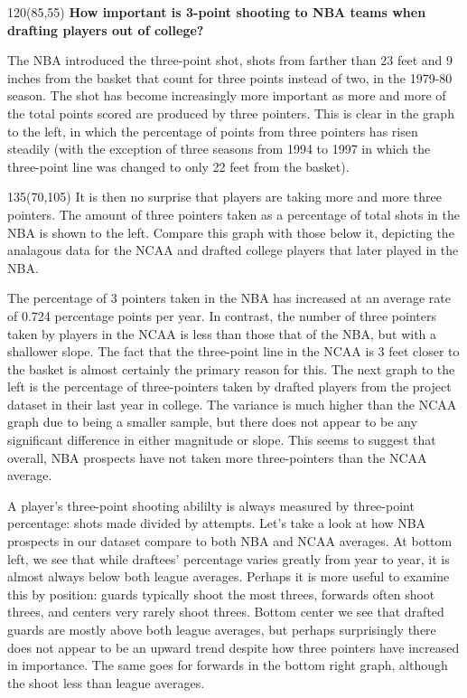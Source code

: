 \documentclass{article}
\begin{document}
   
\begin{textblock}{120}(85,55)
{\bf How important is 3-point shooting to NBA teams when drafting players out of college?}

\vspace{0.1in}
     The NBA introduced the three-point shot, shots from farther than 23 feet and 9 inches from the basket that count for three points instead of two, in the 1979-80 season. The shot has become increasingly more important as more and more of the total points scored are produced by three pointers. This is clear in the graph to the left, in which the percentage of points from three pointers has risen steadily (with the exception of three seasons from 1994 to 1997 in which the three-point line was changed to only 22 feet from the basket).
         \end{textblock}  
         
         

\begin{textblock}{135}(70,105)  
     It is then no surprise that players are taking more and more three pointers. The amount of three pointers taken as a percentage of total shots in the NBA is shown to the left. Compare this graph with those below it, depicting the analagous data for the NCAA and drafted college players that later played in the NBA. 
     
     The percentage of 3 pointers taken in the NBA has increased at an average rate of 0.724 percentage points per year. In contrast, the number of three pointers taken by players in the NCAA is less than those that of the NBA, but with a shallower slope. The fact that the three-point line in the NCAA is 3 feet closer to the basket is almost certainly the primary reason for this. The next graph to the left is the percentage of three-pointers taken by drafted players from the project dataset in their last year in college. The variance is much higher than the NCAA graph due to being a smaller sample, but there does not appear to be any significant difference in either magnitude or slope. This seems to suggest that overall, NBA prospects have not taken more three-pointers than the NCAA average.
     
     \vspace{0.1in}
     A player's three-point shooting abililty is always measured by three-point percentage: shots made divided by attempts. Let's take a look at how NBA prospects in our dataset compare to both NBA and NCAA averages. At bottom left, we see that while draftees' percentage varies greatly from year to year, it is almost always below both league averages. Perhaps it is more useful to examine this by position: guards typically shoot the most threes, forwards often shoot threes, and centers very rarely shoot threes.
     Bottom center we see that drafted guards are mostly above both league averages,  but perhaps surprisingly there does not appear to be an upward trend despite how three pointers have increased in importance. The same goes for forwards in the bottom right graph, although the shoot less than league averages.
    \end{textblock}  
    
\end{document}
